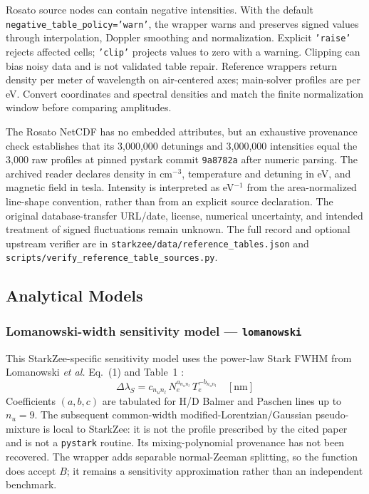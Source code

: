 \documentclass[11pt,a4paper]{article}
\numberwithin{equation}{section}
\begin{document}
Rosato source nodes can contain negative intensities. With the default
\texttt{negative\_table\_\allowbreak policy='warn'}, the wrapper warns and preserves signed values through
interpolation, Doppler smoothing and normalization. Explicit \texttt{'raise'}
rejects affected cells; \texttt{'clip'} projects values to zero with a warning.
Clipping can bias noisy data and is not validated table repair. Reference wrappers
return density per meter of wavelength on air-centered axes; main-solver profiles
are per eV. Convert coordinates and spectral densities and match the finite
normalization window before comparing amplitudes.

The Rosato NetCDF has no embedded attributes, but an exhaustive provenance
check establishes that its 3,000,000 detunings and 3,000,000 intensities equal
the 3,000 raw profiles at pinned pystark commit \texttt{9a8782a} after numeric
parsing. The archived reader declares density in cm$^{-3}$, temperature and
detuning in eV, and magnetic field in tesla. Intensity is interpreted as
eV$^{-1}$ from the area-normalized line-shape convention, rather than from an
explicit source declaration. The original database-transfer URL/date, license,
numerical uncertainty, and intended treatment of signed fluctuations remain
unknown. The full record and optional upstream verifier are in
\texttt{starkzee/data/reference\_tables.json} and
\texttt{scripts/verify\_reference\_table\_sources.py}.

\subsection{Analytical Models}

\subsubsection{Lomanowski-width sensitivity model — \texttt{lomanowski}}

This StarkZee-specific sensitivity model uses the power-law Stark FWHM from Lomanowski \textit{et al.} Eq.~(1) and Table~1 \cite{lomanowski}:
\begin{equation}
\Delta\lambda_S = c_{n_u n_l}\,N_e^{a_{n_u n_l}}\,T_e^{-b_{n_u n_l}} \quad [\mathrm{nm}]
\end{equation}
Coefficients $(a, b, c)$ are tabulated for H/D Balmer and Paschen lines up to $n_u = 9$. The subsequent common-width modified-Lorentzian/Gaussian pseudo-mixture is local to StarkZee: it is not the profile prescribed by the cited paper and is not a \texttt{pystark} routine. Its mixing-polynomial provenance has not been recovered. The wrapper adds separable normal-Zeeman splitting, so the function does accept $B$; it remains a sensitivity approximation rather than an independent benchmark.
\end{document}
